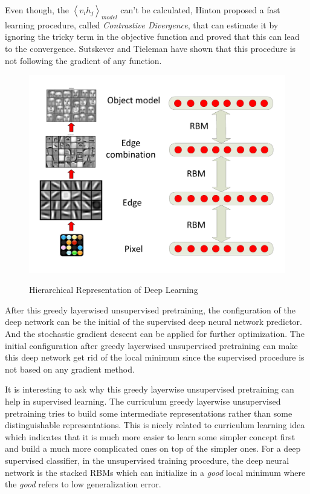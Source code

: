 Even though,  the ${\left\langle {{v_i}{h_j}} \right\rangle _{model}}$ can't be calculated, Hinton proposed a fast learning procedure, called \emph{Contrastive Divergence}, that can estimate it by ignoring the tricky term in the objective function and proved that this can lead to the convergence. Sutskever and Tieleman have shown that this procedure is not following the gradient of any function\cite{SutskeverT10}.
\begin{figure}
  \centering
  \includegraphics[scale=.5]{fig/deeplearning.pdf}\\
  \caption{Hierarchical Representation of Deep Learning}
\end{figure}

After this greedy layerwised unsupervised pretraining, the configuration of the deep network can be the initial of the supervised deep neural network predictor\cite{Srivastava13}. And the stochastic gradient descent can be applied for further optimization. The initial configuration after greedy layerwised unsupervised pretraining can make this deep network get rid of the local minimum since the supervised procedure is not based on any gradient method.

It is interesting to ask why this greedy layerwise unsupervised pretraining can help in supervised learning\cite{ErhanCBV10}. The curriculum greedy layerwise unsupervised pretraining tries to build some intermediate representations rather than some distinguishable representations. This is nicely related to curriculum learning idea which indicates that it is much more easier to learn some simpler concept first and build a much more complicated ones on top of the simpler ones\cite{BengioICML09}. For a deep supervised classifier, in the unsupervised training procedure, the deep neural network is the stacked RBMs which can initialize in a \emph{good} local minimum where the \emph{good} refers to low generalization error\cite{Bengio13}.


